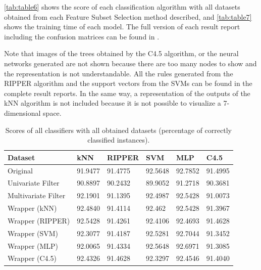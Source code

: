 \documentclass[a4paper,11pt]{article}
\begin{document}
\autoref{tab:table6} shows the score of each classification algorithm with all datasets obtained from each Feature Subset Selection method described, and \autoref{tab:table7} shows the training time of each model. The full version of each result report including the confusion matrices can be found in \cite{repo}.

Note that images of the trees obtained by the C4.5 algorithm, or the neural networks generated are not shown because there are too many nodes to show and the representation is not understandable. All the rules generated from the RIPPER algorithm and the support vectors from the SVMs can be found in the complete result reports. In the same way, a representation of the outputs of the kNN algorithm is not included because it is not possible to visualize a 7-dimensional space.

\begin{table}[h]
\centering
\begin{tabular}{||l|l|l|l|l|l||}
	\hline
	Dataset & kNN & RIPPER & SVM & MLP & C4.5\\
	\hline
	Original & 91.9477 & 91.4775 & 92.5648 & 92.7852 & 91.4995\\
	Univariate Filter & 90.8897 & 90.2432 & 89.9052 & 91.2718 & 90.3681\\
	Multivariate Filter & 92.1901 & 91.1395 & 92.4987 & 92.5428 & 91.0073\\
	Wrapper (kNN) & 92.4840 & 91.4114 & 92.462 & 92.5428 & 91.3967\\
	Wrapper (RIPPER) & 92.5428 & 91.4261 & 92.4106 & 92.4693 & 91.4628\\
	Wrapper (SVM) & 92.3077 & 91.4187 & 92.5281 & 92.7044 & 91.3452\\
	Wrapper (MLP) & 92.0065 & 91.4334 & 92.5648 & 92.6971 & 91.3085\\
	Wrapper (C4.5) & 92.4326 & 91.4628 & 92.3297 & 92.4546 & 91.4040\\
    \hline 
\end{tabular}
\caption{Scores of all classifiers with all obtained datasets (percentage of correctly classified instances).}
\label{tab:table6}
\end{table}
\end{document}
